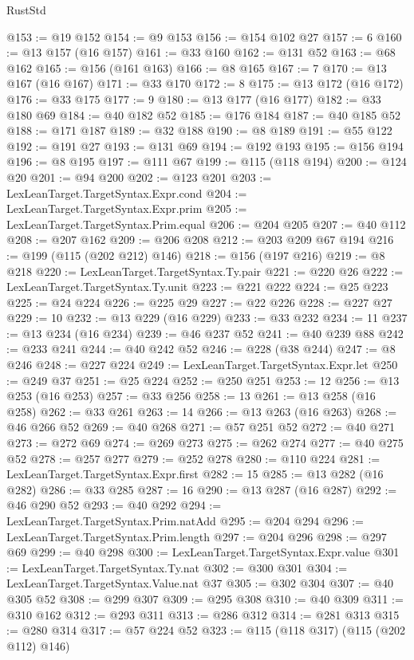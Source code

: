\begin{lexlean}{RustStd}
\begin{coremodule}
{\begin{coremodule}
{{{{{{{{{{{{{{{{{{{{{{{{{{{{{{{{{{{{{{@153 := @19 @152
@154 := @9 @153
@156 := @154 @102 @27
@157 := 6
@160 := @13 @157 (@16 @157)
@161 := @33 @160
@162 := @131 @52
@163 := @68 @162
@165 := @156 (@161 @163)
@166 := @8 @165
@167 := 7
@170 := @13 @167 (@16 @167)
@171 := @33 @170
@172 := 8
@175 := @13 @172 (@16 @172)
@176 := @33 @175
@177 := 9
@180 := @13 @177 (@16 @177)
@182 := @33 @180 @69
@184 := @40 @182 @52
@185 := @176 @184
@187 := @40 @185 @52
@188 := @171 @187
@189 := @32 @188
@190 := @8 @189
@191 := @55 @122
@192 := @191 @27
@193 := @131 @69
@194 := @192 @193
@195 := @156 @194
@196 := @8 @195
@197 := @111 @67
@199 := @115 (@118 @194)
@200 := @124 @20
@201 := @94 @200
@202 := @123 @201
@203 := LexLeanTarget.TargetSyntax.Expr.cond
@204 := LexLeanTarget.TargetSyntax.Expr.prim
@205 := LexLeanTarget.TargetSyntax.Prim.equal
@206 := @204 @205
@207 := @40 @112
@208 := @207 @162
@209 := @206 @208
@212 := @203 @209 @67 @194
@216 := @199 (@115 (@202 @212) @146)
@218 := @156 (@197 @216)
@219 := @8 @218
@220 := LexLeanTarget.TargetSyntax.Ty.pair
@221 := @220 @26
@222 := LexLeanTarget.TargetSyntax.Ty.unit
@223 := @221 @222
@224 := @25 @223
@225 := @24 @224
@226 := @225 @29
@227 := @22 @226
@228 := @227 @27
@229 := 10
@232 := @13 @229 (@16 @229)
@233 := @33 @232
@234 := 11
@237 := @13 @234 (@16 @234)
@239 := @46 @237 @52
@241 := @40 @239 @88
@242 := @233 @241
@244 := @40 @242 @52
@246 := @228 (@38 @244)
@247 := @8 @246
@248 := @227 @224
@249 := LexLeanTarget.TargetSyntax.Expr.let
@250 := @249 @37
@251 := @25 @224
@252 := @250 @251
@253 := 12
@256 := @13 @253 (@16 @253)
@257 := @33 @256
@258 := 13
@261 := @13 @258 (@16 @258)
@262 := @33 @261
@263 := 14
@266 := @13 @263 (@16 @263)
@268 := @46 @266 @52
@269 := @40 @268
@271 := @57 @251 @52
@272 := @40 @271
@273 := @272 @69
@274 := @269 @273
@275 := @262 @274
@277 := @40 @275 @52
@278 := @257 @277
@279 := @252 @278
@280 := @110 @224
@281 := LexLeanTarget.TargetSyntax.Expr.first
@282 := 15
@285 := @13 @282 (@16 @282)
@286 := @33 @285
@287 := 16
@290 := @13 @287 (@16 @287)
@292 := @46 @290 @52
@293 := @40 @292
@294 := LexLeanTarget.TargetSyntax.Prim.natAdd
@295 := @204 @294
@296 := LexLeanTarget.TargetSyntax.Prim.length
@297 := @204 @296
@298 := @297 @69
@299 := @40 @298
@300 := LexLeanTarget.TargetSyntax.Expr.value
@301 := LexLeanTarget.TargetSyntax.Ty.nat
@302 := @300 @301
@304 := LexLeanTarget.TargetSyntax.Value.nat @37
@305 := @302 @304
@307 := @40 @305 @52
@308 := @299 @307
@309 := @295 @308
@310 := @40 @309
@311 := @310 @162
@312 := @293 @311
@313 := @286 @312
@314 := @281 @313
@315 := @280 @314
@317 := @57 @224 @52
@323 := @115 (@118 @317) (@115 (@202 @112) @146)
}}}}}}}}}}}}}}}}}}}}}}}}}}}}}}}}}}}}}}
\end{coremodule}}
\end{coremodule}
\end{lexlean}
